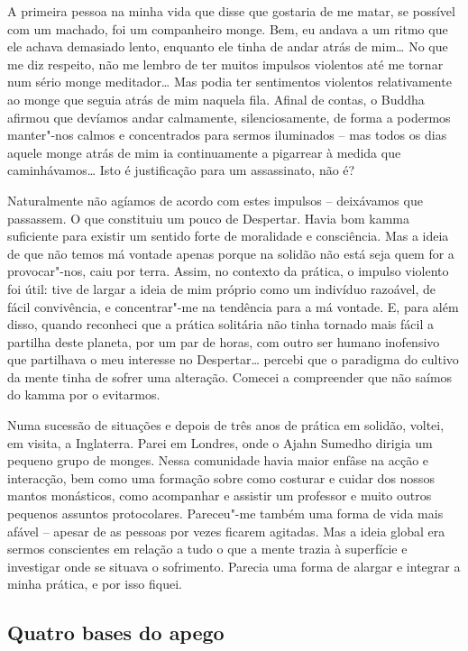A primeira pessoa na minha vida que disse que gostaria de me matar, se possível
com um machado, foi um companheiro monge. Bem, eu andava a um ritmo que ele
achava demasiado lento, enquanto ele tinha de andar atrás de mim\ldots{} No que
me diz respeito, não me lembro de ter muitos impulsos violentos até me tornar
num sério monge meditador\ldots{} Mas podia ter sentimentos violentos
relativamente ao monge que seguia atrás de mim naquela fila. Afinal de contas, o
Buddha afirmou que devíamos andar calmamente, silenciosamente, de forma a
podermos manter"-nos calmos e concentrados para sermos iluminados -- mas todos
os dias aquele monge atrás de mim ia continuamente a pigarrear à medida que
caminhávamos\ldots{} Isto é justificação para um assassinato, não é?

Naturalmente não agíamos de acordo com estes impulsos -- deixávamos que
passassem. O que constituiu um pouco de Despertar. Havia bom kamma suficiente
para existir um sentido forte de moralidade e consciência. Mas a ideia de que
não temos má vontade apenas porque na solidão não está seja quem for a
provocar"-nos, caiu por terra. Assim, no contexto da prática, o impulso violento
foi útil: tive de largar a ideia de mim próprio como um indivíduo razoável, de
fácil convivência, e concentrar"-me na tendência para a má vontade. E, para além
disso, quando reconheci que a prática solitária não tinha tornado mais fácil a
partilha deste planeta, por um par de horas, com outro ser humano inofensivo que
partilhava o meu interesse no Despertar\ldots{} percebi que o paradigma do
cultivo da mente tinha de sofrer uma alteração. Comecei a compreender que não
saímos do kamma por o evitarmos.

Numa sucessão de situações e depois de três anos de prática em solidão, voltei,
em visita, a Inglaterra. Parei em Londres, onde o Ajahn Sumedho dirigia um
pequeno grupo de monges. Nessa comunidade havia maior enfâse na acção e
interacção, bem como uma formação sobre como costurar e cuidar dos nossos mantos
monásticos, como acompanhar e assistir um professor e muito outros pequenos
assuntos protocolares. Pareceu"-me também uma forma de vida mais afável --
apesar de as pessoas por vezes ficarem agitadas. Mas a ideia global era sermos
conscientes em relação a tudo o que a mente trazia à superfície e investigar
onde se situava o sofrimento. Parecia uma forma de alargar e integrar a minha
prática, e por isso fiquei.

\subsection{Quatro bases do apego}

